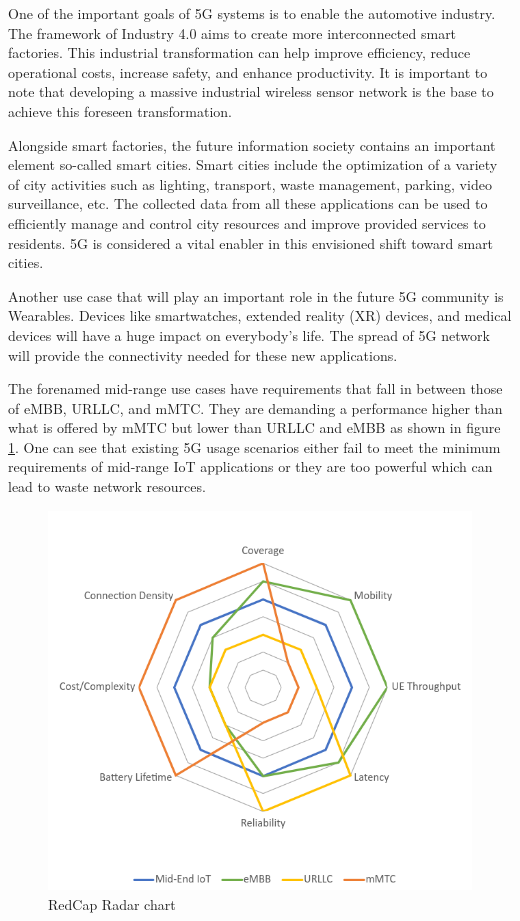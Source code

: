 \documentclass[]{IEEEtran}
\begin{document}
One of the important goals of 5G systems is to enable the automotive industry. The framework of Industry 4.0 aims to create more interconnected smart factories. This industrial transformation can help improve efficiency, reduce operational costs, increase safety, and enhance productivity. It is important to note that developing a massive industrial wireless sensor network is the base to achieve this foreseen transformation.

Alongside smart factories, the future information society contains an important element so-called smart cities. Smart cities include the optimization of a variety of city activities such as lighting, transport, waste management, parking, video surveillance, etc. The collected data from all these applications can be used to efficiently manage and control city resources and improve provided services to residents. 5G is considered a vital enabler in this envisioned shift toward smart cities.

Another use case that will play an important role in the future 5G community is Wearables. Devices like smartwatches, extended reality (XR) devices, and medical devices will have a huge impact on everybody's life. The spread of 5G network will provide the connectivity needed for these new applications.

The forenamed mid-range use cases have requirements that fall in between those of eMBB, URLLC, and mMTC. They are demanding a performance higher than what is offered by mMTC but lower than URLLC and eMBB as shown in figure \ref{fig:redcap-spider}. One can see that existing 5G usage scenarios either fail to meet the minimum requirements of mid-range IoT applications or they are too powerful which can lead to waste network resources.

\begin{figure}
    \centering
    \includegraphics[width=\linewidth]{Pictures/Radar Chart RedCap.png}    
    \caption{RedCap Radar chart}
    \label{fig:redcap-spider}
\end{figure}
\end{document}
